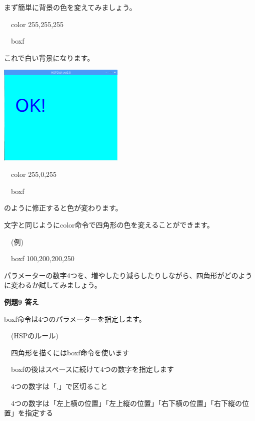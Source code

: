 \documentclass[a4paper,12pt]{jarticle}
\begin{document}
まず簡単に背景の色を変えてみましょう。

\ \ color 255,255,255

\ \ boxf

これで白い背景になります。

\bigskip
\bigskip

\begin{minipage}{9.781cm}
\centering
{\upshape
\includegraphics[keepaspectratio,width=6.006cm,height=4.77cm]{text02-img/text02-img036.png}}
\end{minipage}

\bigskip
\bigskip
\bigskip

\ \ color 255,0,255

\ \ boxf

\bigskip

のように修正すると色が変わります。

文字と同じようにcolor命令で四角形の色を変えることができます。

\bigskip

\ \ (例)

\ \ boxf 100,200,200,250


\bigskip

パラメーターの数字4つを、増やしたり減らしたりしながら、四角形がどのように変わるか試してみましょう。


\bigskip


\bigskip

{\bfseries
例題9 答え}

\bigskip

boxf命令は4つのパラメーターを指定します。


\bigskip

\ \ (HSPのルール)


\bigskip

\ \ 四角形を描くにはboxf命令を使います

\ \ boxfの後はスペースに続けて4つの数字を指定します

\ \ 4つの数字は「,」で区切ること

\ \ 4つの数字は「左上横の位置」「左上縦の位置」「右下横の位置」「右下縦の位置」を指定する
\end{document}
